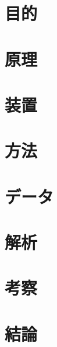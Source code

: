 \documentclass[uplatex,11pt]{jsarticle}
\begin{document}
\section{目的}
\section{原理}
\section{装置}
\section{方法}
\section{データ}
\section{解析}
\section{考察}
\section{結論}
\end{document}
